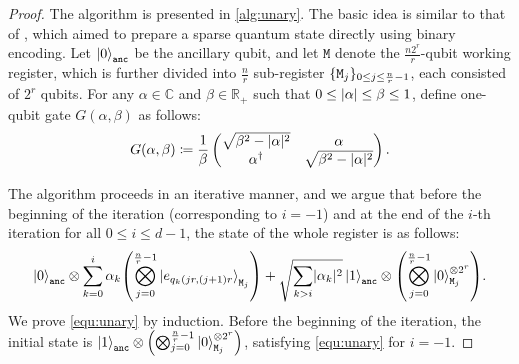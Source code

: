 \documentclass[a4paper,UKenglish,cleveref, autoref, thm-restate]{lipics-v2021}
\DeclarePairedDelimiter\rbra{\lparen}{\rparen}
\DeclarePairedDelimiter\cbra{\{}{\}}
\DeclarePairedDelimiter\abs{\lvert}{\rvert}
\begin{document}
\begin{proof}
    The algorithm is presented in \cref{alg:unary}. The basic idea is similar to that of \cite{de2020circuit, de2022double, mao2024towards}, which aimed to prepare a sparse quantum state directly using binary encoding. Let $\ket{0}_{\texttt{anc}}$ be the ancillary qubit, and let $\texttt{M}$ denote the $\frac{n2^r}{r}$-qubit working register, which is further divided into $\frac{n}{r}$ sub-register $\cbra{\texttt{M}_j}_{0\leq j \leq \frac{n}{r}-1}$, each consisted of $2^r$ qubits. For any $\alpha \in \mathbb{C}$ and $\beta \in \mathbb{R}_+$ such that $0 \leq \abs{\alpha} \leq \beta \leq 1$, define one-qubit gate $G(\alpha, \beta)$ as follows:
    \begin{align}
        G(\alpha, \beta) \coloneqq \frac{1}{\beta}
        \begin{pmatrix}
       \sqrt{\beta^2 - \abs{\alpha}^2}     & \alpha \\
    \alpha^\dagger & \sqrt{\beta^2 - \abs{\alpha}^2}
        \end{pmatrix}.
    \end{align}

    The algorithm proceeds in an iterative manner, and we argue that before the beginning of the iteration (corresponding to $i = -1$) and at the end of the $i$-th iteration for all $0 \leq i \leq d-1$, the state of the whole register is as follows:
    \begin{align}
        \ket{0}_{\texttt{anc}} \otimes \sum_{k=0}^{i}\alpha_k\rbra*{\bigotimes_{j=0}^{\frac{n}{r}-1}\ket{e_{q_k(jr, (j+1)r}}_{\texttt{M}_j}} + \sqrt{\sum_{k > i} \abs{\alpha_k}^2}\ket{1}_{\texttt{anc}} \otimes \rbra*{\bigotimes_{j=0}^{\frac{n}{r}-1}\ket{0}^{\otimes 2^r}_{\texttt{M}_j}}. \label{equ:unary}
    \end{align}
    We prove \cref{equ:unary} by induction. Before the beginning of the iteration, the initial state is $\ket{1}_{\texttt{anc}} \otimes \rbra*{\bigotimes_{j=0}^{\frac{n}{r}-1}\ket{0}^{\otimes 2^r}_{\texttt{M}_j}}$, satisfying \cref{equ:unary} for $i = -1$.
    

\end{proof}
\end{document}
